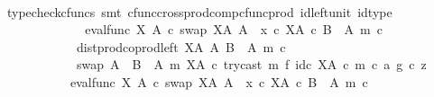 \begin{isabellebody}
\ \ \ \ \ \ \ \ \ \ \ \ \isamarkupfalse%
\ {\isacharparenleft}{\kern0pt}typecheck{\isacharunderscore}{\kern0pt}cfuncs{\isacharcomma}{\kern0pt}\ smt\ cfunc{\isacharunderscore}{\kern0pt}cross{\isacharunderscore}{\kern0pt}prod{\isacharunderscore}{\kern0pt}comp{\isacharunderscore}{\kern0pt}cfunc{\isacharunderscore}{\kern0pt}prod\ id{\isacharunderscore}{\kern0pt}left{\isacharunderscore}{\kern0pt}unit{}\ id{\isacharunderscore}{\kern0pt}type{\isacharparenright}{\kern0pt}\isanewline
\ \ \ \ \ \ \ \ \ \ \isamarkupfalse%
\ \isamarkupfalse%
\ {\isachardoublequoteopen}{\isacharparenleft}{\kern0pt}eval{\isacharunderscore}{\kern0pt}func\ X\ A\ {\isasymcirc}\isactrlsub c\ swap\ {\isacharparenleft}{\kern0pt}X\isactrlbsup A\isactrlesup {\isacharparenright}{\kern0pt}\ A{\isacharparenright}{\kern0pt}\ {\isasymamalg}\ {\isacharparenleft}{\kern0pt}x\ {\isasymcirc}\isactrlsub c\ {\isasymbeta}\isactrlbsub X\isactrlbsup A\isactrlesup \ {\isasymtimes}\isactrlsub c\ {\isacharparenleft}{\kern0pt}B\ {\isasymsetminus}\ {\isacharparenleft}{\kern0pt}A{\isacharcomma}{\kern0pt}\ m{\isacharparenright}{\kern0pt}{\isacharparenright}{\kern0pt}\isactrlesub {\isacharparenright}{\kern0pt}\ {\isasymcirc}\isactrlsub c\isanewline
\ \ \ \ \ \ \ \ \ \ \ \ dist{\isacharunderscore}{\kern0pt}prod{\isacharunderscore}{\kern0pt}coprod{\isacharunderscore}{\kern0pt}left\ {\isacharparenleft}{\kern0pt}X\isactrlbsup A\isactrlesup {\isacharparenright}{\kern0pt}\ A\ {\isacharparenleft}{\kern0pt}B\ {\isasymsetminus}\ {\isacharparenleft}{\kern0pt}A{\isacharcomma}{\kern0pt}\ m{\isacharparenright}{\kern0pt}{\isacharparenright}{\kern0pt}\ {\isasymcirc}\isactrlsub c\isanewline
\ \ \ \ \ \ \ \ \ \ \ \ swap\ {\isacharparenleft}{\kern0pt}A\ {\isasymCoprod}\ {\isacharparenleft}{\kern0pt}B\ {\isasymsetminus}\ {\isacharparenleft}{\kern0pt}A{\isacharcomma}{\kern0pt}\ m{\isacharparenright}{\kern0pt}{\isacharparenright}{\kern0pt}{\isacharparenright}{\kern0pt}\ {\isacharparenleft}{\kern0pt}X\isactrlbsup A\isactrlesup {\isacharparenright}{\kern0pt}\ {\isasymcirc}\isactrlsub c\ {\isacharparenleft}{\kern0pt}try{\isacharunderscore}{\kern0pt}cast\ m\ {\isasymtimes}\isactrlsub f\ id\isactrlsub c\ {\isacharparenleft}{\kern0pt}X\isactrlbsup A\isactrlesup {\isacharparenright}{\kern0pt}{\isacharparenright}{\kern0pt}\ {\isasymcirc}\isactrlsub c\ {\isasymlangle}m\ {\isasymcirc}\isactrlsub c\ a{\isacharcomma}{\kern0pt}\ g\ {\isasymcirc}\isactrlsub c\ z{\isasymrangle}\isanewline
\ \ \ \ \ \ \ \ \ \ {\isacharequal}{\kern0pt}\ {\isacharparenleft}{\kern0pt}eval{\isacharunderscore}{\kern0pt}func\ X\ A\ {\isasymcirc}\isactrlsub c\ swap\ {\isacharparenleft}{\kern0pt}X\isactrlbsup A\isactrlesup {\isacharparenright}{\kern0pt}\ A{\isacharparenright}{\kern0pt}\ {\isasymamalg}\ {\isacharparenleft}{\kern0pt}x\ {\isasymcirc}\isactrlsub c\ {\isasymbeta}\isactrlbsub X\isactrlbsup A\isactrlesup \ {\isasymtimes}\isactrlsub c\ {\isacharparenleft}{\kern0pt}B\ {\isasymsetminus}\ {\isacharparenleft}{\kern0pt}A{\isacharcomma}{\kern0pt}\ m{\isacharparenright}{\kern0pt}{\isacharparenright}{\kern0pt}\isactrlesub {\isacharparenright}{\kern0pt}\ {\isasymcirc}\isactrlsub c\isanewline

\end{isabellebody}
